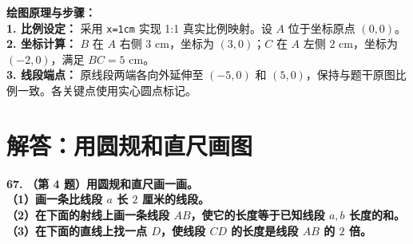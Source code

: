 \vspace{0.6cm}

\begin{center}
\end{center}

\vspace{0.4cm}
{\small\color{blue!70!black}
\textbf{绘图原理与步骤：}\\
\textbf{1. 比例设定：} 采用 \texttt{x=1cm} 实现 1:1 真实比例映射。设 $A$ 位于坐标原点 $(0,0)$。\\
\textbf{2. 坐标计算：} $B$ 在 $A$ 右侧 $3$ cm，坐标为 $(3,0)$；$C$ 在 $A$ 左侧 $2$ cm，坐标为 $(-2,0)$，满足 $BC = 5$ cm。\\
\textbf{3. 线段端点：} 原线段两端各向外延伸至 $(-5,0)$ 和 $(5,0)$，保持与题干原图比例一致。各关键点使用实心圆点标记。
}

\newpage



\newpage

\section{解答：用圆规和直尺画图}

\vspace{0.6cm}

\textbf{\LARGE 67.} \textbf{（第 4 题）用圆规和直尺画一画。\\[1.5ex]
（1）画一条比线段 $a$ 长 $2$ 厘米的线段。\\[1ex]
（2）在下面的射线上画一条线段 $AB$，使它的长度等于已知线段 $a, b$ 长度的和。\\[1ex]
（3）在下面的直线上找一点 $D$，使线段 $CD$ 的长度是线段 $AB$ 的 $2$ 倍。}

